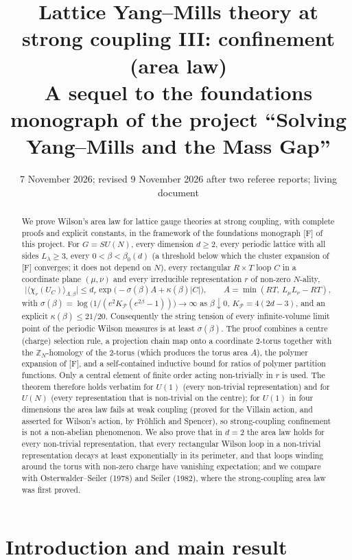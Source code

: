 \documentclass[11pt,a4paper]{article}
\title{Lattice Yang--Mills theory at strong coupling III: confinement (area law)\\
\large A sequel to the foundations monograph of the project ``Solving Yang--Mills and the Mass Gap''}
\author{}
\date{7 November 2026; revised 9 November 2026 after two referee reports; living document}
\theoremstyle{definition}
\theoremstyle{remark}
\newcommand{\Z}{\mathbb{Z}}
\newcommand{\cP}{\mathcal{P}}
\begin{document}
\maketitle

\begin{abstract}
We prove Wilson's area law for lattice gauge theories at strong coupling, with complete proofs and explicit
constants, in the framework of the foundations monograph [F] of this project. For $G=SU(N)$, every dimension
$d\ge2$, every periodic lattice with all sides $L_\lambda\ge3$, every $0<\beta<\beta_0(d)$ (a threshold below which the
cluster expansion of [F] converges; it does not depend on $N$), every rectangular $R\times T$ loop $C$ in a coordinate plane
$(\mu,\nu)$ and every irreducible representation $r$ of non-zero $N$-ality,
\[
\bigl|\langle\chi_r(U_C)\rangle_{\Lambda,\beta}\bigr|\le d_r\exp\bigl(-\sigma(\beta)A+\kappa(\beta)|C|\bigr),
\qquad A=\min(RT,\,L_\mu L_\nu-RT),
\]
with $\sigma(\beta)=\log\bigl(1/(e^2K_\cP(e^{2\beta}-1))\bigr)\to\infty$ as $\beta\downarrow0$, $K_\cP=4(2d-3)$, and
an explicit $\kappa(\beta)\le 21/20$. Consequently the string tension of every infinite-volume limit point of the periodic Wilson measures is at
least $\sigma(\beta)$. The proof combines a centre (charge) selection rule, a projection chain map onto a coordinate
$2$-torus together with the $\Z_N$-homology of the $2$-torus (which produces the torus area $A$), the polymer
expansion of [F], and a self-contained inductive bound for ratios of polymer partition functions. Only a central
element of finite order acting non-trivially in $r$ is used. The theorem therefore holds verbatim for
$U(1)$ (every non-trivial representation) and for $U(N)$ (every representation that is non-trivial on the centre); for
$U(1)$ in four dimensions the area law fails at weak coupling (proved for the Villain action, and asserted for Wilson's
action, by Fröhlich and Spencer), so strong-coupling confinement is not a non-abelian phenomenon. We also prove that in $d=2$ the area law holds for
every non-trivial representation, that every rectangular Wilson loop in a non-trivial representation decays at least exponentially in its
perimeter, and that loops winding around the torus with non-zero charge have vanishing expectation; and we compare
with Osterwalder--Seiler (1978) and Seiler (1982), where the strong-coupling area law was first proved.
\end{abstract}

\tableofcontents

\section{Introduction and main result}\label{al:sec:intro}
\end{document}
